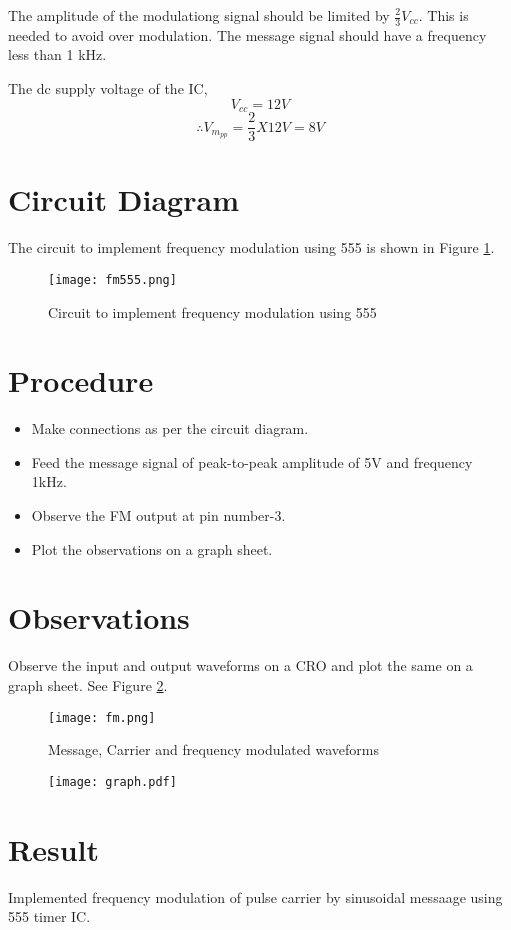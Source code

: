 The amplitude of the modulationg signal should be limited by $\frac{2}{3}V_{cc}$. This is needed to avoid over modulation. The message signal should have a frequency less than 1 kHz.

The dc supply voltage of the IC, 
\begin{equation}
V_{cc}=12 V
\end{equation}
\begin{equation}
\therefore V_{m_{pp}}=\frac{2}{3}X12 V=8V
\end{equation}
\section*{Circuit Diagram}
The circuit to implement frequency modulation using 555 is shown in Figure \ref{fm555ckt}.

\begin{figure}
\texttt{[image: fm555.png]}
\caption{Circuit to implement frequency modulation using 555}
\label{fm555ckt}
\end{figure}

\section*{Procedure}

\begin{itemize}
\item
Make connections as per the circuit diagram.

\item

Feed the message signal of peak-to-peak amplitude of 5V and frequency 1kHz.
\item Observe the FM output at pin number-3.

\item
Plot the observations on a graph sheet.
\end{itemize}


\section*{Observations}
Observe the input and output waveforms on a CRO and plot the same on a graph sheet. See Figure \ref{fmwaves}.


\begin{figure}
\begin{center}
\texttt{[image: fm.png]}
\caption{Message, Carrier and frequency modulated waveforms}
\label{fmwaves}
\end{center}


\end{figure}


\begin{figure}
	\texttt{[image: graph.pdf]}
\end{figure}



\section*{Result}
Implemented frequency modulation of pulse carrier by sinusoidal messaage using 555 timer IC.




